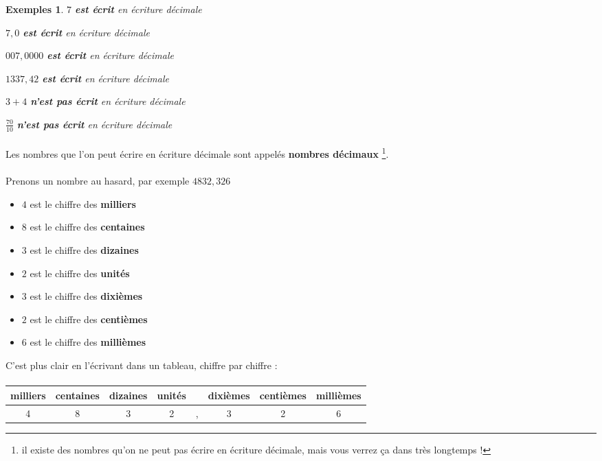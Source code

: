 \documentclass[12pt]{article}
\newtheorem*{examples}{Exemples}
\begin{document}
\begin{examples}

  $7$ \textbf{est écrit} en écriture décimale

  $7,0$ \textbf{est écrit} en écriture décimale

  $007,0000$ \textbf{est écrit} en écriture décimale

  $1337,42$ \textbf{est écrit} en écriture décimale

  $3+4$ \textbf{n'est pas écrit} en écriture décimale

  $\frac{70}{10}$ \textbf{n'est pas écrit} en écriture décimale
\end{examples}

\paragraph{}
Les nombres que l'on peut écrire en écriture décimale sont appelés \textbf{nombres décimaux} \footnote{il existe des nombres qu'on ne peut pas écrire en écriture décimale, mais vous verrez ça dans très longtemps !}.

\paragraph{}
Prenons un nombre au hasard, par exemple $4832,326$
\begin{itemize}
  \item $4$ est le chiffre des \textbf{milliers}
  \item $8$ est le chiffre des \textbf{centaines}
  \item $3$ est le chiffre des \textbf{dizaines}
  \item $2$ est le chiffre des \textbf{unités}
  \item $3$ est le chiffre des \textbf{dixièmes}
  \item $2$ est le chiffre des \textbf{centièmes}
  \item $6$ est le chiffre des \textbf{millièmes}
\end{itemize}

C'est plus clair en l'écrivant dans un tableau, chiffre par chiffre :

\paragraph{}
\begin{tabular}{|c|c|c|c|c|c|c|c|}
\hline
milliers & centaines & dizaines & unités & & dixièmes & centièmes & millièmes \\
\hline
4 & 8 & 3 & 2 & , & 3 & 2 & 6 \\
\hline
\end{tabular}
\end{document}
